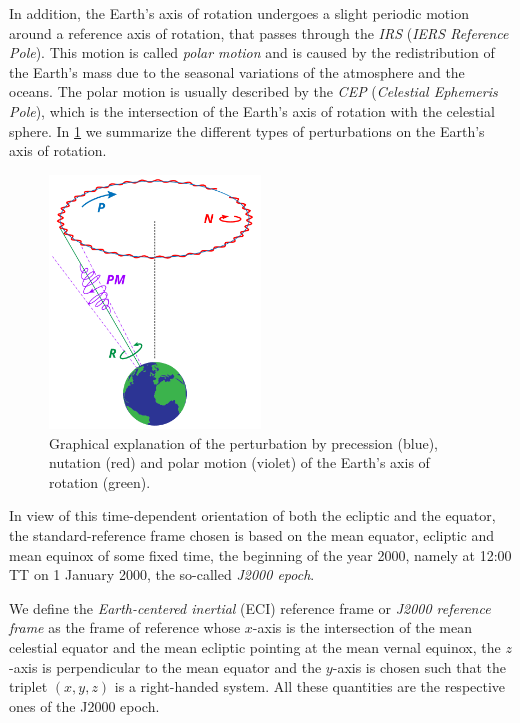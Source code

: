 \documentclass[../main.tex]{subfiles}
\begin{document}
In addition, the Earth's axis of rotation undergoes a slight periodic motion around a reference axis of rotation, that passes through the \emph{IRS} (\emph{IERS Reference Pole}). This motion is called \emph{polar motion} and is caused by the redistribution of the Earth's mass due to the seasonal variations of the atmosphere and the oceans. The polar motion is usually described by the \emph{CEP} (\emph{Celestial Ephemeris Pole}), which is the intersection of the Earth's axis of rotation with the celestial sphere. In \cref{fig:prec_nut} we summarize the different types of perturbations on the Earth's axis of rotation.

\begin{figure}[ht]
  \centering
  \includegraphics[width=0.5\textwidth]{Images/precession_nutation.pdf}
  \caption{Graphical explanation of the perturbation by precession (blue), nutation (red) and polar motion (violet) of the Earth's axis of rotation (green).}
  \label{fig:prec_nut}
\end{figure}

In view of this time-dependent orientation of both the ecliptic and the equator, the standard-reference frame chosen is based on the mean equator, ecliptic and mean equinox of some fixed time, the beginning of the year 2000, namely at 12:00 TT on 1 January 2000, the so-called \emph{J2000 epoch}.
\begin{definition}
  We define the \emph{Earth-centered inertial} (ECI) reference frame or \emph{J2000 reference frame} as the frame of reference whose $x$-axis is the intersection of the mean celestial equator and the mean ecliptic pointing at the mean vernal equinox, the $z$-axis is perpendicular to the mean equator and the $y$-axis is chosen such that the triplet $(x,y,z)$ is a right-handed system. All these quantities are the respective ones of the J2000 epoch.
\end{definition}
\end{document}
